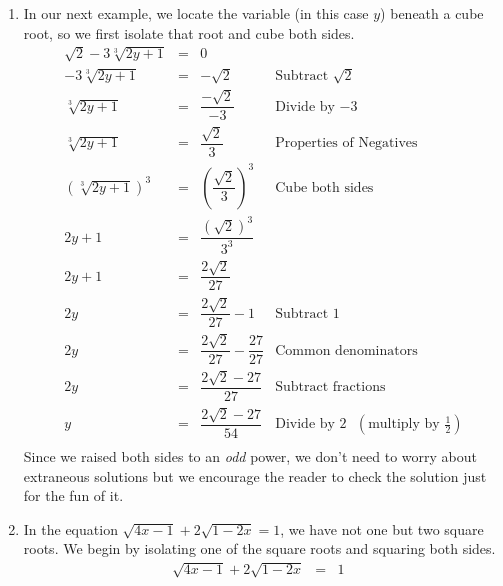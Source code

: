 \begin{ex}
\begin{enumerate}
\item  In our next example, we locate the variable (in this case $y$) beneath a cube root, so we first isolate that root and cube both sides. \[ \begin{array}{rclr}


\sqrt{2} - 3\sqrt[3]{2y+1} &  = &  0 & \\[2pt]

- 3\sqrt[3]{2y+1} &  = &  - \sqrt{2} & \text{Subtract $\sqrt{2}$} \\[2pt]

\sqrt[3]{2y+1} & = & \dfrac{-\sqrt{2}}{-3} & \text{Divide by $-3$} \\[8pt]

\sqrt[3]{2y+1} & = & \dfrac{\sqrt{2}}{3}  & \text{Properties of Negatives} \\[8pt]

(\sqrt[3]{2y+1})^3 & = & \left( \dfrac{\sqrt{2}}{3} \right)^{3} & \text{Cube both sides} \\[12pt]

2y + 1 & = & \dfrac{(\sqrt{2})^3}{3^3} & \\[8pt]

2y + 1 & = & \dfrac{2\sqrt{2}}{27} & \\ [8pt]
2y  & = & \dfrac{2 \sqrt{2}}{27}  - 1 & \text{Subtract $1$} \\[8pt]

2y  & = & \dfrac{2 \sqrt{2}}{27}  - \dfrac{27}{27} & \text{Common denominators} \\ [8pt]

2y  & = & \dfrac{2 \sqrt{2} - 27}{27} & \text{Subtract fractions} \\[8pt]

y  & = & \dfrac{2 \sqrt{2} - 27}{54} & \text{Divide by $2$ $\left(\text{multiply by $\frac{1}{2}$} \right)$} \\

\end{array}\] Since we raised both sides to an \textit{odd} power, we don't need to worry about extraneous solutions but we encourage the reader to check the solution just for the fun of it.

\item In the equation $\sqrt{4x-1}  + 2\sqrt{1 - 2x} = 1$, we have not one but two square roots.  We begin by isolating one of the square roots and squaring both sides.\[ \begin{array}{rclr}

\sqrt{4x-1}  + 2\sqrt{1 - 2x} & = & 1 & \\ [2pt]


\end{array}\]
\end{enumerate}
\end{ex}
